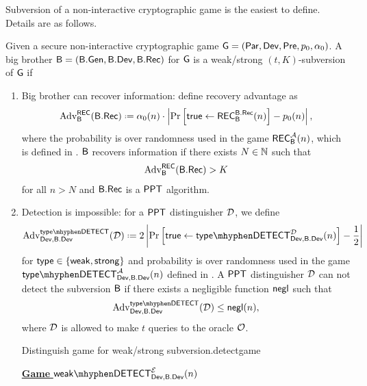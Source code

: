Subversion of a non-interactive cryptographic game is the easiest to define. Details are as follows.

\begin{defn}
	Given a secure non-interactive cryptographic game $\operatorname{\mathsf{G}}=\left(\operatorname{\mathsf{Par}},\operatorname{\mathsf{Dev}},\operatorname{\mathsf{Pre}},p_{0},\alpha_{0}\right)$. A big brother $\mathsf{B} = \left(\mathsf{B}.\mathsf{Gen},\mathsf{B}.\mathsf{Dev},\mathsf{B}.\mathsf{Rec}\right)$ for $\operatorname{\mathsf{G}}$ is a weak/strong $(t,K)$-subversion of $\operatorname{\mathsf{G}}$ if 
	\begin{enumerate}[1.]

		\item Big brother can recover information: define recovery advantage as
		\begin{align*} 
			\adv_{\bb}^{\recgame}(\bbrec)\defeq \secf(n)\cdot \left\vert \prob{\true\leftarrow \recgame_{\bb}^{\bbrec}(n)} - \basep(n)\right\vert,
		\end{align*}
		where the probability is over randomness used in the game $\mathsf{REC}_{\mathsf{B}}^{\mathcal{A}}(n)$, which is defined in . $\mathsf{B}$ recovers information if  there exists $N\in\mathbb{N}$ such that
		\begin{align*}
			\operatorname{Adv}_{\mathsf{B}}^{\mathsf{REC}}(\mathsf{B}.\mathsf{Rec})>K
		\end{align*}
		for all $n>N$ and $\mathsf{B}.\mathsf{Rec}$ is a $\mathsf{PPT}$ algorithm.
		\item  Detection is impossible: for a $\mathsf{PPT}$ distinguisher $\operatorname{\mathcal{D}}$, we define 
		\begin{align*}
		\adv_{\dev,\bbdev}^{\notationtypedetect}(\dist) \defeq 2\left\vert \prob{\true\leftarrow \typedetect{\dev}{\bbdev}{\dist}}-\frac{1}{2}\right\vert 
		\end{align*}
		for $\mathsf{type}\in\{\mathsf{weak},\mathsf{strong}\}$ and probability is over randomness used in the game $\typedetect{\dev}{\bbdev}{\adve}$ defined in . A $\mathsf{PPT}$ distinguisher $\operatorname{\mathcal{D}}$ can not detect the subversion $\mathsf{B}$ if there exists a negligible function $\operatorname{\mathsf{negl}}$ such that
		\begin{align*}
			\adv_{\dev,\bbdev}^{\notationtypedetect}(\dist)\leq \negl(n),
		\end{align*}
		where $\operatorname{\mathcal{D}}$ is allowed to make $t$ queries to the oracle $\operatorname{\mathcal{O}}$.
		\begin{boxfigTwo}{Distinguish game for weak/strong subversion.}{detectgame}
\begin{minipage}{0.45\textwidth}
    \smallskip
	\begin{description}
 	\item[\underline{\textbf{Game} $\weakdetect{\dev}{\bbdev}{\eve}$}] ~
 	

\end{description}
\end{minipage}
\end{boxfigTwo}
\end{enumerate}
\end{defn}
